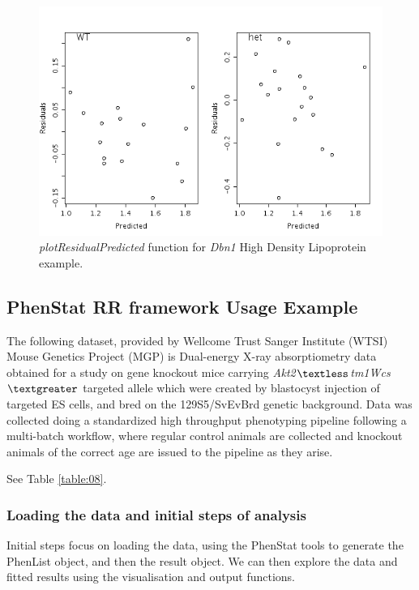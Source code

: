 \documentclass[12pt,a4paper]{article}
\begin{document}
\begin{itemize}
\begin{figure}[H]%
\centerline{\includegraphics[scale=0.5]{cs_tf_7.png}}
\caption{\textit{plotResidualPredicted} function for \textit{Dbn1} High Density Lipoprotein example.}\label{fig:cs_tf7}
\end{figure}
\end{itemize}

\subsection{PhenStat RR framework Usage Example}
The following dataset, provided by Wellcome Trust Sanger Institute (WTSI) Mouse Genetics Project (MGP) is Dual-energy X-ray absorptiometry data obtained for a study on gene knockout mice carrying \textit{Akt2$\textless$tm1Wcs$\textgreater$} targeted allele which were created by blastocyst injection of targeted ES cells, and bred on the 129S5\//SvEvBrd genetic background. Data was collected doing a standardized high throughput phenotyping pipeline following a multi-batch workflow, where regular control animals are collected and knockout animals of the correct age are issued to the pipeline as they arise. 

See Table \ref{table:08}.

\subsubsection{Loading the data and initial steps of analysis}
Initial steps focus on loading the data, using the PhenStat tools to generate the PhenList object, and then the result object. We can then explore the data and fitted results using the visualisation and output functions.
\end{document}
